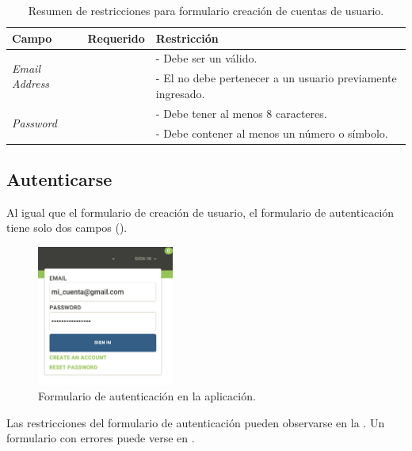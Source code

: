 \begin{table}[H]
    \centering
	\begin{tabular}{ |l|c||l| }
		\hline Campo & Requerido & Restricción \\ \hline
		\multirow{2}{*}{\textit{Email Address}} &  \multirow{2}{*}{\checkmark}
				& - Debe ser un \email válido. \\ 
			& 	& - El \email no debe pertenecer a un usuario previamente ingresado.\\ \hline
		\multirow{2}{*}{\textit{Password}} 		&  \multirow{2}{*}{\checkmark}	
				& - Debe tener al menos 8 caracteres. \\ 
			& 	& - Debe contener al menos un número o símbolo. \\ \hline
	\end{tabular}
 	\caption{Resumen de restricciones para formulario creación de cuentas de usuario.}
    \label{tab:architecture:accounts:new:form}
\end{table}

\subsection{Autenticarse}

Al igual que el formulario de creación de usuario, el formulario de autenticación tiene solo dos campos ().

\begin{figure}[H]
	\centering
	\includegraphics[width=0.4\textwidth]{figuras/architecture/accounts/signin/form.png}
	\caption{Formulario de autenticación en la aplicación.}
	\label{figure:account:signin:form}
\end{figure}

Las restricciones del formulario de autenticación pueden observarse en la . Un formulario con errores puede verse en .

